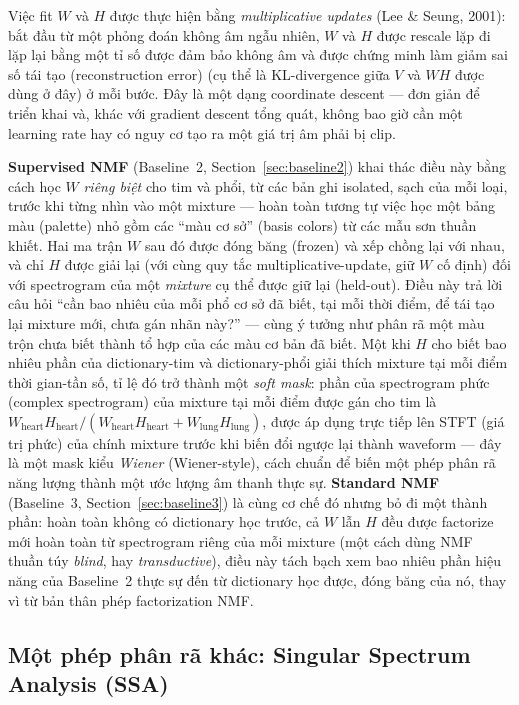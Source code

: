 \documentclass[11pt]{article}
\begin{document}
Việc fit $W$ và $H$ được thực hiện bằng \emph{multiplicative updates} (Lee
\& Seung, 2001): bắt đầu từ một phỏng đoán không âm ngẫu nhiên, $W$ và $H$
được rescale lặp đi lặp lại bằng một tỉ số được đảm bảo không âm và được
chứng minh làm giảm sai số tái tạo (reconstruction error) (cụ thể là
KL-divergence giữa $V$ và $WH$ được dùng ở đây) ở mỗi bước. Đây là một
dạng coordinate descent --- đơn giản để triển khai và, khác với gradient
descent tổng quát, không bao giờ cần một learning rate hay có nguy cơ tạo
ra một giá trị âm phải bị clip.

\textbf{Supervised NMF} (Baseline~2, Section~\ref{sec:baseline2}) khai
thác điều này bằng cách học $W$ \emph{riêng biệt} cho tim và phổi, từ các
bản ghi isolated, sạch của mỗi loại, trước khi từng nhìn vào một mixture
--- hoàn toàn tương tự việc học một bảng màu (palette) nhỏ gồm các ``màu
cơ sở'' (basis colors) từ các mẫu sơn thuần khiết. Hai ma trận $W$ sau đó
được đóng băng (frozen) và xếp chồng lại với nhau, và chỉ $H$ được giải
lại (với cùng quy tắc multiplicative-update, giữ $W$ cố định) đối với
spectrogram của một \emph{mixture} cụ thể được giữ lại (held-out). Điều
này trả lời câu hỏi ``cần bao nhiêu của mỗi phổ cơ sở đã biết, tại mỗi
thời điểm, để tái tạo lại mixture mới, chưa gán nhãn này?'' --- cùng ý
tưởng như phân rã một màu trộn chưa biết thành tổ hợp của các màu cơ bản
đã biết. Một khi $H$ cho biết bao nhiêu phần của dictionary-tim và
dictionary-phổi giải thích mixture tại mỗi điểm thời gian-tần số, tỉ lệ đó
trở thành một \emph{soft mask}: phần của spectrogram phức (complex
spectrogram) của mixture tại mỗi điểm được gán cho tim là
$W_{\text{heart}}H_{\text{heart}} /
(W_{\text{heart}}H_{\text{heart}}+W_{\text{lung}}H_{\text{lung}})$, được
áp dụng trực tiếp lên STFT (giá trị phức) của chính mixture trước khi biến
đổi ngược lại thành waveform --- đây là một mask kiểu \emph{Wiener}
(Wiener-style), cách chuẩn để biến một phép phân rã năng lượng thành một
ước lượng âm thanh thực sự. \textbf{Standard NMF} (Baseline~3,
Section~\ref{sec:baseline3}) là cùng cơ chế đó nhưng bỏ đi một thành phần:
hoàn toàn không có dictionary học trước, cả $W$ lẫn $H$ đều được factorize
mới hoàn toàn từ spectrogram riêng của mỗi mixture (một cách dùng NMF
thuần túy \emph{blind}, hay \emph{transductive}), điều này tách bạch xem
bao nhiêu phần hiệu năng của Baseline~2 thực sự đến từ dictionary học
được, đóng băng của nó, thay vì từ bản thân phép factorization NMF.

\subsection{Một phép phân rã khác: Singular Spectrum Analysis (SSA)}
\label{sec:bg-ssa}
\end{document}
